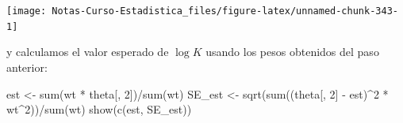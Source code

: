 \documentclass[
  12pt,
]{book}
\newenvironment{Shaded}{\begin{snugshade}}{\end{snugshade}}
\newcommand{\AttributeTok}[1]{\textcolor[rgb]{0.77,0.63,0.00}{#1}}
\newcommand{\ConstantTok}[1]{\textcolor[rgb]{0.00,0.00,0.00}{#1}}
\newcommand{\DecValTok}[1]{\textcolor[rgb]{0.00,0.00,0.81}{#1}}
\newcommand{\FunctionTok}[1]{\textcolor[rgb]{0.00,0.00,0.00}{#1}}
\newcommand{\NormalTok}[1]{#1}
\newcommand{\OtherTok}[1]{\textcolor[rgb]{0.56,0.35,0.01}{#1}}
\newcommand{\SpecialCharTok}[1]{\textcolor[rgb]{0.00,0.00,0.00}{#1}}
\theoremstyle{definition}
\theoremstyle{definition}
\theoremstyle{definition}
\theoremstyle{definition}
\theoremstyle{remark}
\begin{document}
\begin{Shaded}
\end{Shaded}

\begin{center}\texttt{[image: Notas-Curso-Estadistica\_files/figure-latex/unnamed-chunk-343-1]} \end{center}

y calculamos el valor esperado de \(\log K\) usando los pesos obtenidos del paso anterior:

\begin{Shaded}
\begin{Highlighting}[]
\NormalTok{est }\OtherTok{\textless{}{-}} \FunctionTok{sum}\NormalTok{(wt }\SpecialCharTok{*}\NormalTok{ theta[, }\DecValTok{2}\NormalTok{])}\SpecialCharTok{/}\FunctionTok{sum}\NormalTok{(wt)}
\NormalTok{SE\_est }\OtherTok{\textless{}{-}} \FunctionTok{sqrt}\NormalTok{(}\FunctionTok{sum}\NormalTok{((theta[, }\DecValTok{2}\NormalTok{] }\SpecialCharTok{{-}}\NormalTok{ est)}\SpecialCharTok{\^{}}\DecValTok{2} \SpecialCharTok{*}\NormalTok{ wt}\SpecialCharTok{\^{}}\DecValTok{2}\NormalTok{))}\SpecialCharTok{/}\FunctionTok{sum}\NormalTok{(wt)}
\FunctionTok{show}\NormalTok{(}\FunctionTok{c}\NormalTok{(est, SE\_est))}
\end{Highlighting}
\end{Shaded}
\end{document}
